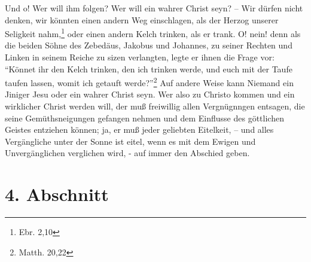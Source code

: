 Und o! Wer will ihm folgen? Wer will ein wahrer Christ seyn? -- Wir dürfen nicht denken, wir könnten einen andern Weg einschlagen, als der Herzog unserer Seligkeit nahm,\footnote{Ebr. 2,10} oder einen andern Kelch trinken, als er trank. O! nein! denn als die beiden Söhne des Zebedäus, Jakobus und Johannes, zu seiner Rechten und Linken in seinem Reiche zu sizen verlangten, legte er ihnen die Frage vor: "`Könnet ihr den Kelch trinken, den ich trinken werde, und euch mit der Taufe taufen lassen, womit ich getauft werde?"'\footnote{Matth. 20,22} Auf andere Weise kann Niemand ein Jiniger Jesu oder ein wahrer Christ seyn. Wer also zu Christo kommen und ein wirklicher Christ werden will, der muß freiwillig allen Vergnügnngen entsagen, die seine Gemüthsneigungen gefangen nehmen und dem Einflusse des göttlichen Geistes entziehen können; ja, er muß jeder geliebten Eitelkeit, – und alles Vergängliche unter der Sonne ist eitel, wenn es mit dem Ewigen und Unvergänglichen verglichen wird, - auf immer den Abschied geben.

\section{4. Abschnitt}

